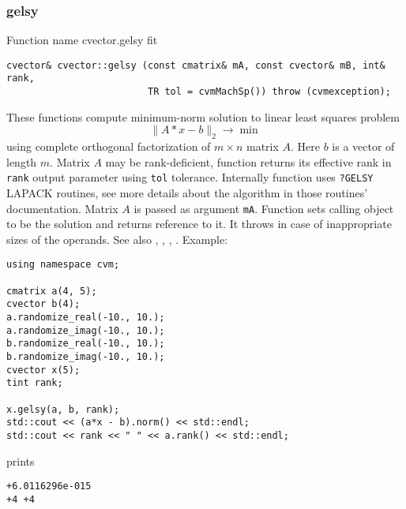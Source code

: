 \subsubsection{gelsy}
Function%
\pdfdest name {cvector.gelsy} fit
\begin{verbatim}
cvector& cvector::gelsy (const cmatrix& mA, const cvector& mB, int& rank,
                         TR tol = cvmMachSp()) throw (cvmexception);
\end{verbatim}
These functions 
compute minimum-norm solution to  linear
least squares problem 
\begin{equation*}
\|A*x-b\|_2\to\min
\end{equation*}
using  complete orthogonal factorization of $m\times n$ matrix $A$.
Here $b$ is a vector of length $m$.
Matrix $A$ may be rank-deficient, function returns its effective rank in \verb"rank"
output parameter using \verb"tol" tolerance.
Internally  function uses \verb"?GELSY" LAPACK routines, see more details
about the algorithm in those routines' documentation.
Matrix $A$ is passed as  argument \verb"mA".
Function sets calling object to be the solution and returns reference to it.
It throws
in case of inappropriate sizes of the operands.
See also , 
, , 
.
Example:
\begin{Verbatim}
using namespace cvm;

cmatrix a(4, 5);
cvector b(4);
a.randomize_real(-10., 10.);
a.randomize_imag(-10., 10.);
b.randomize_real(-10., 10.);
b.randomize_imag(-10., 10.);
cvector x(5);
tint rank;

x.gelsy(a, b, rank);
std::cout << (a*x - b).norm() << std::endl;
std::cout << rank << " " << a.rank() << std::endl;
\end{Verbatim}
prints
\begin{Verbatim}
+6.0116296e-015
+4 +4
\end{Verbatim}
\newpage



